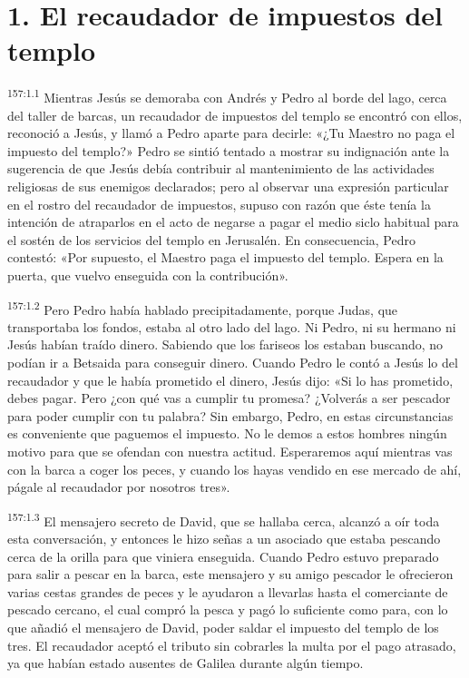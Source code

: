\section*{1. El recaudador de impuestos del templo}
\par 
\textsuperscript{157:1.1} Mientras Jesús se demoraba con Andrés y Pedro al borde del lago, cerca del taller de barcas, un recaudador de impuestos del templo se encontró con ellos, reconoció a Jesús, y llamó a Pedro aparte para decirle: «¿Tu Maestro no paga el impuesto del templo?» Pedro se sintió tentado a mostrar su indignación ante la sugerencia de que Jesús debía contribuir al mantenimiento de las actividades religiosas de sus enemigos declarados; pero al observar una expresión particular en el rostro del recaudador de impuestos, supuso con razón que éste tenía la intención de atraparlos en el acto de negarse a pagar el medio siclo habitual para el sostén de los servicios del templo en Jerusalén. En consecuencia, Pedro contestó: «Por supuesto, el Maestro paga el impuesto del templo. Espera en la puerta, que vuelvo enseguida con la contribución».

\par 
\textsuperscript{157:1.2} Pero Pedro había hablado precipitadamente, porque Judas, que transportaba los fondos, estaba al otro lado del lago. Ni Pedro, ni su hermano ni Jesús habían traído dinero. Sabiendo que los fariseos los estaban buscando, no podían ir a Betsaida para conseguir dinero. Cuando Pedro le contó a Jesús lo del recaudador y que le había prometido el dinero, Jesús dijo: «Si lo has prometido, debes pagar. Pero ¿con qué vas a cumplir tu promesa? ¿Volverás a ser pescador para poder cumplir con tu palabra? Sin embargo, Pedro, en estas circunstancias es conveniente que paguemos el impuesto. No le demos a estos hombres ningún motivo para que se ofendan con nuestra actitud. Esperaremos aquí mientras vas con la barca a coger los peces, y cuando los hayas vendido en ese mercado de ahí, págale al recaudador por nosotros tres».

\par 
\textsuperscript{157:1.3} El mensajero secreto de David, que se hallaba cerca, alcanzó a oír toda esta conversación, y entonces le hizo señas a un asociado que estaba pescando cerca de la orilla para que viniera enseguida. Cuando Pedro estuvo preparado para salir a pescar en la barca, este mensajero y su amigo pescador le ofrecieron varias cestas grandes de peces y le ayudaron a llevarlas hasta el comerciante de pescado cercano, el cual compró la pesca y pagó lo suficiente como para, con lo que añadió el mensajero de David, poder saldar el impuesto del templo de los tres. El recaudador aceptó el tributo sin cobrarles la multa por el pago atrasado, ya que habían estado ausentes de Galilea durante algún tiempo.

